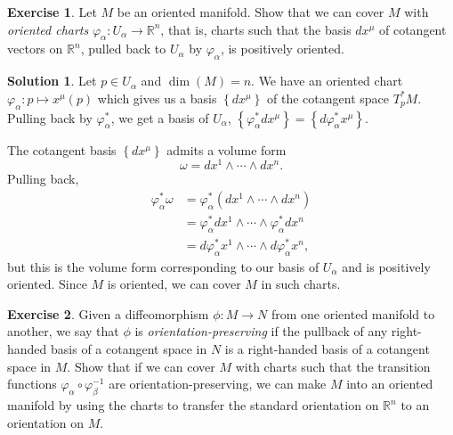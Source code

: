 \documentclass[11pt, a4paper]{report}
\theoremstyle{definition}
\newtheorem{exercise}{Exercise}[part]
\newtheorem{solution}{Solution}[part]
\newenvironment{ex}{\begin{exercise}}{\end{exercise}\pagebreak[1]}
\newenvironment{sol}{\begin{solution}}{\end{solution}\pagebreak[3]}
\begin{document}
\begin{ex}

Let $M$ be an oriented manifold. Show that we can cover $M$ with \emph{oriented charts} $\varphi_\alpha: U_\alpha \to \mathbb{R}^n$, that is, charts such that the basis $dx^\mu$ of cotangent vectors on $\mathbb{R}^n$, pulled back to $U_\alpha$ by $\varphi_\alpha$, is positively oriented.

\end{ex}

\begin{sol}

Let $p \in U_\alpha$ and $\dim(M) = n$. We have an oriented chart $\varphi_\alpha: p \mapsto x^\mu(p)$ which gives us a basis $\left\{dx^\mu\right\}$ of the cotangent space $T_p^*M$.
Pulling back by $\varphi_\alpha^*$, we get a basis of $U_\alpha$, $\left\{\varphi_\alpha^*dx^\mu\right\} = \left\{d\varphi_\alpha^*x^\mu\right\}$.

The cotangent basis $\left\{dx^\mu\right\}$ admits a volume form
\[
    \omega = dx^1 \wedge \cdots \wedge dx^n.
\]
Pulling back,
\begin{align*}
    \varphi_\alpha^* \omega &= \varphi_\alpha^* (dx^1 \wedge \cdots \wedge dx^n) \\
        &= \varphi_\alpha^* dx^1 \wedge \cdots \wedge \varphi_\alpha^* dx^n \\
        &= d\varphi_\alpha^* x^1 \wedge \cdots \wedge d\varphi_\alpha^* x^n,
\end{align*}
but this is the volume form corresponding to our basis of $U_\alpha$ and is positively oriented. Since $M$ is oriented, we can cover $M$ in such charts.

\end{sol}

\begin{ex}

Given a diffeomorphism $\phi: M \to N$ from one oriented manifold to another, we say that $\phi$ is \emph{orientation-preserving} if the pullback of any right-handed basis of a cotangent space in $N$ is a right-handed basis of a cotangent space in $M$. Show that if we can cover $M$ with charts such that the transition functions $\varphi_\alpha \circ \varphi_\beta^{-1}$ are orientation-preserving, we can make $M$ into an oriented manifold by using the charts to transfer the standard orientation on $\mathbb{R}^n$ to an orientation on $M$.

\end{ex}
\end{document}
